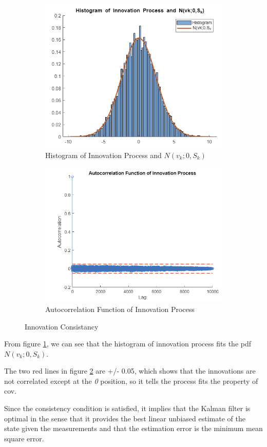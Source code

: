 \begin{figure}[H]
    \centering
    \begin{subfigure}[b]{0.45\textwidth}
        \includegraphics[width=\textwidth]{images/1e21.png}
        \caption{Histogram of Innovation Process and $N(v_k;0,S_k)$}
        \label{e21}
    \end{subfigure}
    \hfill
    \begin{subfigure}[b]{0.45\textwidth}
        \includegraphics[width=\textwidth]{images/1e22.png}
        \caption{Autocorrelation Function of Innovation Process}
        \label{e22}
    \end{subfigure}
    \caption{Innovation Consistancy}
    \label{e21e22}
    \end{figure}
    
From figure \ref{e21}, we can see that the histogram of innovation process fits the pdf $N(v_k;0,S_k)$.

The two red lines in figure \ref{e22} are +/- 0.05, which shows that the innovations are not correlated except at the \emph{0} position, so it tells the process fits the property of cov.

Since the consistency condition is satisfied, it implies that the Kalman filter is optimal in the sense that it provides the best linear unbiased estimate of the state given the measurements and that the estimation error is the minimum mean square error.
